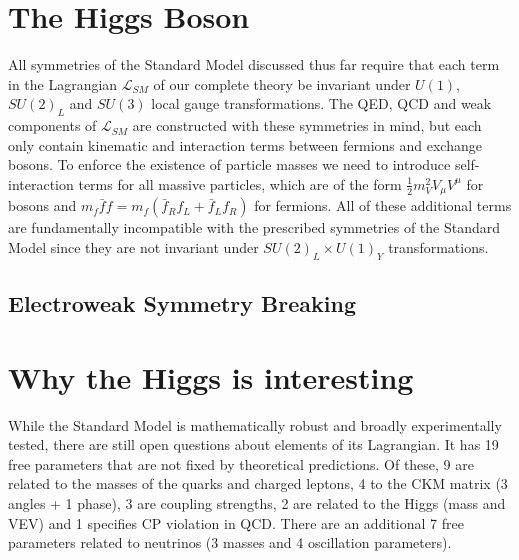 \section{The Higgs Boson}

All symmetries of the Standard Model discussed thus far require that each term in the Lagrangian 
$\mathcal{L}_{SM}$ of our complete theory be invariant under $U(1)$, $SU(2)_L$ and $SU(3)$ local gauge 
transformations. The QED, QCD and weak components of $\mathcal{L}_{SM}$ are constructed with these symmetries 
in mind, but each only contain kinematic and interaction terms between fermions and exchange bosons. To enforce 
the existence of particle masses we need to introduce self-interaction terms for all massive particles, which are of the 
form $\frac{1}{2}m_V^2V_{\mu}V^{\mu}$ for bosons and $m_f\bar{f}f = m_f(\bar{f}_Rf_L + \bar{f}_Lf_R)$ for 
fermions. All of these additional terms are fundamentally incompatible with the prescribed symmetries of the Standard 
Model since they are not invariant under $SU(2)_L \times U(1)_Y$ transformations.

\subsection{Electroweak Symmetry Breaking}

\section{Why the Higgs is interesting}

While the Standard Model is mathematically robust and broadly experimentally tested, there are still open 
questions about elements of its Lagrangian. It has 19 free parameters that are not fixed by theoretical 
predictions. Of these, 9 are related to the masses of the quarks and charged leptons, 4 to the CKM 
matrix (3 angles + 1 phase), 3 are coupling strengths, 2 are related to the Higgs (mass and VEV) and 1 
specifies CP violation in QCD. There are an additional 7 free parameters related to neutrinos (3 masses and 
4 oscillation parameters). 

